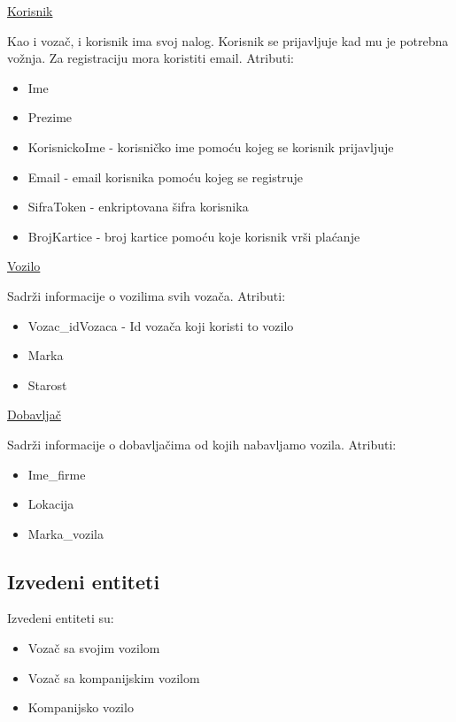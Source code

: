 \begin{flushleft}
\underline{Korisnik}
\end{flushleft}
Kao i vozač, i korisnik ima svoj nalog. Korisnik se prijavljuje kad mu je potrebna vožnja. Za registraciju mora koristiti email. Atributi:
\begin{itemize}
    \item Ime
    \item Prezime
    \item KorisnickoIme - korisničko ime pomoću kojeg se korisnik prijavljuje
    \item Email - email korisnika pomoću kojeg se registruje
    \item SifraToken - enkriptovana šifra korisnika
    \item BrojKartice - broj kartice pomoću koje korisnik vrši plaćanje
\end{itemize}

\begin{flushleft}
\underline{Vozilo}
\end{flushleft}
Sadrži informacije o vozilima svih vozača. Atributi:
\begin{itemize}
    \item Vozac\_idVozaca - Id vozača koji koristi to vozilo
    \item Marka
    \item Starost
\end{itemize}

\begin{flushleft}
\underline{Dobavljač}
\end{flushleft}
Sadrži informacije o dobavljačima od kojih nabavljamo vozila. Atributi:
\begin{itemize}
    \item Ime\_firme
    \item Lokacija
    \item Marka\_vozila
\end{itemize}


\subsection{\textbf{Izvedeni entiteti}}
Izvedeni entiteti su:
\begin{itemize}
    \item Vozač sa svojim vozilom
    \item Vozač sa kompanijskim vozilom
    \item Kompanijsko vozilo
\end{itemize}

